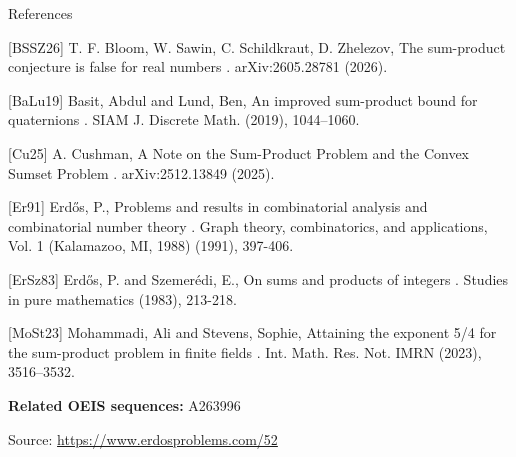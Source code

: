 \documentclass{article}
\begin{document}
References

[BSSZ26] T. F. Bloom, W. Sawin, C. Schildkraut, D. Zhelezov, The sum-product conjecture is false for real numbers . arXiv:2605.28781 (2026).

[BaLu19] Basit, Abdul and Lund, Ben, An improved sum-product bound for quaternions . SIAM J. Discrete Math. (2019), 1044--1060.

[Cu25] A. Cushman, A Note on the Sum-Product Problem and the Convex Sumset Problem . arXiv:2512.13849 (2025).

[Er91] Erd\H{o}s, P., Problems and results in combinatorial analysis and combinatorial number theory . Graph theory, combinatorics, and applications, Vol. 1 (Kalamazoo, MI, 1988) (1991), 397-406.

[ErSz83] Erd\H{o}s, P. and Szemer\'{e}di, E., On sums and products of integers . Studies in pure mathematics (1983), 213-218.

[MoSt23] Mohammadi, Ali and Stevens, Sophie, Attaining the exponent 5/4 for the sum-product problem in finite fields . Int. Math. Res. Not. IMRN (2023), 3516--3532.

\noindent\textbf{Related OEIS sequences:} A263996


\bigskip
\noindent\small{Source: \url{https://www.erdosproblems.com/52}}
\end{document}
